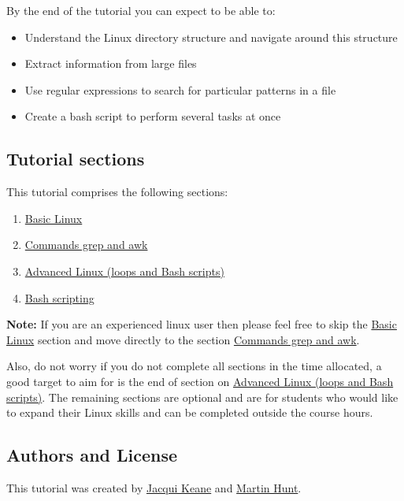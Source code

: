 \documentclass[11pt]{article}
\providecommand{\tightlist}{%
      \setlength{\itemsep}{0pt}\setlength{\parskip}{0pt}}
\begin{document}
By the end of the tutorial you can expect to be able to:

\begin{itemize}
\tightlist
\item
  Understand the Linux directory structure and navigate around this
  structure
\item
  Extract information from large files
\item
  Use regular expressions to search for particular patterns in a file
\item
  Create a bash script to perform several tasks at once
\end{itemize}

\hypertarget{tutorial-sections}{%
\subsection{Tutorial sections}\label{tutorial-sections}}

This tutorial comprises the following sections:

\begin{enumerate}
\def\labelenumi{\arabic{enumi}.}
\tightlist
\item
  \href{basic.ipynb}{Basic Linux}
\item
  \href{grep_and_awk.ipynb}{Commands grep and awk}
\item
  \href{advanced_linux.ipynb}{Advanced Linux (loops and Bash scripts)}
\item
  \href{bash.ipynb}{Bash scripting}
\end{enumerate}

\textbf{Note:} If you are an experienced linux user then please feel
free to skip the \href{basic.ipynb}{Basic Linux} section and move
directly to the section \href{grep_and_awk.ipynb}{Commands grep and
awk}.

Also, do not worry if you do not complete all sections in the time
allocated, a good target to aim for is the end of section on
\href{advanced_linux.ipynb}{Advanced Linux (loops and Bash scripts)}.
The remaining sections are optional and are for students who would like
to expand their Linux skills and can be completed outside the course
hours.

\hypertarget{authors-and-license}{%
\subsection{Authors and License}\label{authors-and-license}}

This tutorial was created by
\href{https://github.com/jacquikeane}{Jacqui Keane} and
\href{https://github.com/martinghunt}{Martin Hunt}.
\end{document}

